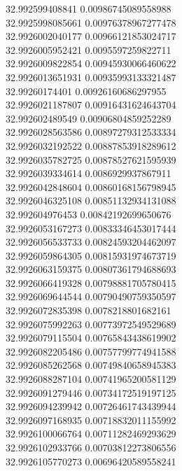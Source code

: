 {32.992599408841	0.00986745089558988\\
32.9925998085661	0.00976378967277478\\
32.9926002040177	0.00966121853024717\\
32.9926005952421	0.0095597259822711\\
32.9926009822854	0.00945930066460622\\
32.9926013651931	0.00935993133321487\\
32.99260174401	0.00926160686297955\\
32.9926021187807	0.00916431624643704\\
32.992602489549	0.00906804859252289\\
32.9926028563586	0.00897279312533334\\
32.9926032192522	0.00887853918289612\\
32.9926035782725	0.00878527621595939\\
32.9926039334614	0.0086929937867911\\
32.9926042848604	0.00860168156798945\\
32.9926046325108	0.00851132934131088\\
32.992604976453	0.00842192699650676\\
32.9926053167273	0.00833346453017444\\
32.9926056533733	0.00824593204462097\\
32.9926059864305	0.00815931974673719\\
32.9926063159375	0.00807361794688693\\
32.9926066419328	0.00798881705780415\\
32.9926069644544	0.00790490759350597\\
32.9926072835398	0.0078218801682161\\
32.9926075992263	0.00773972549529689\\
32.9926079115504	0.00765843438619902\\
32.9926082205486	0.00757799774941588\\
32.9926085262568	0.00749840658945383\\
32.9926088287104	0.00741965200581129\\
32.9926091279446	0.00734172519197125\\
32.9926094239942	0.00726461743439944\\
32.9926097168935	0.00718832011155992\\
32.9926100066764	0.00711282469293629\\
32.9926102933766	0.00703812273806556\\
32.9926105770273	0.00696420589558241\\
}
